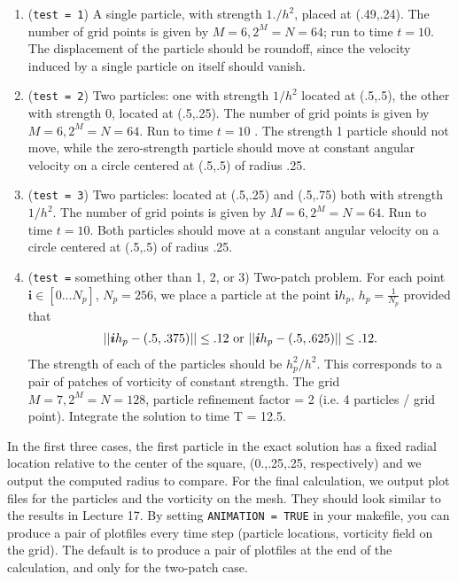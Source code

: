 \documentclass[11pt]{article}
\begin{document}
\begin{enumerate}
\item ({\tt test = 1})
A single particle, with strength $1./h^2$, placed at (.49,.24). The number of grid points is given by $M=6 , 2^M = N = 64$; run to time $t=10$.
The displacement of the particle should be roundoff, since the velocity induced by a single particle on itself should vanish. 
\item ({\tt test = 2})
Two particles: one with strength $1/h^2$ located at (.5,.5), the other with strength 0, located at (.5,.25). The number of grid points is given by $M = 6, 2^M = N = 64$. Run to time $t=10$ . The strength 1 particle should not move, while the zero-strength particle should move at constant angular velocity on a circle centered at (.5,.5) of radius .25. 
\item ({\tt test = 3})
Two particles: located at (.5,.25) and (.5,.75) both with strength $1/h^2$. The number of grid points is given by $M = 6, 2^M = N = 64$. Run to time $t=10$. Both particles should move at a constant angular velocity on a circle centered at (.5,.5) of radius .25. 
\item ({\tt test =} something other than 1, 2, or 3)
Two-patch problem. For each point 
$ \boldsymbol{i}\in [0 \dots N_p]$, $N_p = 256$, we place a particle at the point $\boldsymbol{i} h_p$, $h_p = \frac{1}{N_p}$ provided that 
\begin{gather*}
|| \boldsymbol{i}h_p - (.5,.375) || \leq .12 \hbox { or } || \boldsymbol{i} h_p - (.5,.625) || \leq .12.
\end{gather*}
The strength of each of the particles should be $h_p^2/h^2$. This corresponds to a pair of patches of vorticity of constant strength. The grid $M=7, 2^M = N = 128$, particle refinement factor = 2 (i.e. 4 particles / grid point). Integrate the solution to time T = 12.5. 


\end{enumerate}
In the first three cases, the first particle in the exact solution has a fixed radial location relative to the center of the square, (0.,.25,.25, respectively) and we output the computed radius to compare. For the final calculation, we output plot files for the particles and the vorticity on the mesh. They should look similar to the results in Lecture 17. By setting {\tt ANIMATION = TRUE} in your makefile, you can produce a pair of plotfiles every time step (particle locations, vorticity field on the grid). The default is to produce a pair of plotfiles at the end of the calculation, and only for the two-patch case.
\end{document}
